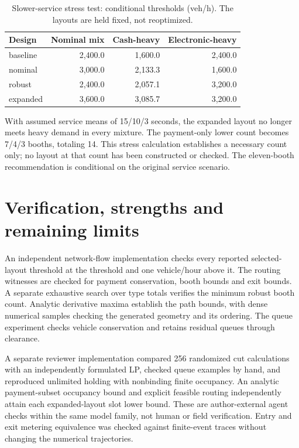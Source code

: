 \documentclass[12pt,letterpaper]{article}
\begin{document}
\begin{table}[H]\centering\small\caption{Slower-service stress test: conditional thresholds (veh/h). The layouts are held fixed, not reoptimized.}\begin{tabular}{@{}lrrr@{}}\toprule
Design & Nominal mix & Cash-heavy & Electronic-heavy\\\midrule
baseline & 2,400.0 & 1,600.0 & 2,400.0\\
nominal & 3,000.0 & 2,133.3 & 1,600.0\\
robust & 2,400.0 & 2,057.1 & 3,200.0\\
expanded & 3,600.0 & 3,085.7 & 3,200.0\\
\bottomrule\end{tabular}\end{table}
With assumed service means of 15/10/3 seconds, the expanded layout no longer meets heavy demand in every mixture. The payment-only lower count becomes 7/4/3 booths, totaling 14. This stress calculation establishes a necessary count only; no layout at that count has been constructed or checked. The eleven-booth recommendation is conditional on the original service scenario.

\section{Verification, strengths and remaining limits}
An independent network-flow implementation checks every reported selected-layout threshold at the threshold and one vehicle/hour above it. The routing witnesses are checked for payment conservation, booth bounds and exit bounds. A separate exhaustive search over type totals verifies the minimum robust booth count. Analytic derivative maxima establish the path bounds, with dense numerical samples checking the generated geometry and its ordering. The queue experiment checks vehicle conservation and retains residual queues through clearance.

A separate reviewer implementation compared 256 randomized cut calculations with an independently formulated LP, checked queue examples by hand, and reproduced unlimited holding with nonbinding finite occupancy. An analytic payment-subset occupancy bound and explicit feasible routing independently attain each expanded-layout slot lower bound. These are author-external agent checks within the same model family, not human or field verification. Entry and exit metering equivalence was checked against finite-event traces without changing the numerical trajectories.
\end{document}
